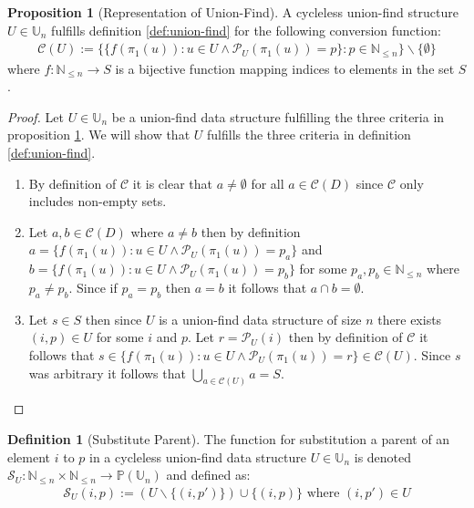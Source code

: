 \documentclass[a4paper,12pt]{article}
\theoremstyle{definition}
\newtheorem{definition}{Definition}[section]
\newtheorem{proposition}{Proposition}[section]
\begin{document}
\begin{proposition}[Representation of
    Union-Find]\label{def:representation-union-find} A cycleless union-find structure $U
    \in \mathbb{U}_n$ fulfills definition \ref{def:union-find} for the following conversion function:
    \begin{align*}
        \mathcal{C}(U) := \{\{f(\pi_1(u)) : u \in U \land \mathcal{P}_U(\pi_1(u)) = p \} : p \in \mathbb{N}_{\leq n}\} \backslash \{\emptyset\}
    \end{align*}
    where $f : \mathbb{N}_{\leq n} \to S$ is a bijective function mapping
    indices to elements in the set $S$.
\end{proposition}
\begin{proof}
    Let $U \in \mathbb{U}_n$ be a union-find data structure fulfilling the three
    criteria in proposition \ref{def:representation-union-find}. We will show
    that $U$ fulfills the three criteria in definition \ref{def:union-find}.

    \begin{enumerate}
        \item By definition of $\mathcal{C}$ it is clear that $a \neq \emptyset$
        for all $a \in \mathcal{C}(D)$ since $\mathcal{C}$ only includes
        non-empty sets.
        \item Let $a, b \in \mathcal{C}(D)$ where $a \neq b$ then by definition
        $a = \{f(\pi_1(u)) : u \in U \land \mathcal{P}_U(\pi_1(u)) = p_a \}$ and
        $b = \{f(\pi_1(u)) : u \in U \land \mathcal{P}_U(\pi_1(u)) = p_b \}$ for
        some $p_a, p_b \in \mathbb{N}_{\leq n}$ where $p_a \neq p_b$. Since if
        $p_a = p_b$ then $a = b$ it follows that $a \cap b = \emptyset$.
        \item Let $s \in S$ then since $U$ is a union-find data structure of size
        $n$ there exists $(i, p) \in U$ for some $i$ and $p$. Let $r =
        \mathcal{P}_U(i)$ then by definition of $\mathcal{C}$ it follows that $s
        \in \{f(\pi_1(u)) : u \in U \land \mathcal{P}_U(\pi_1(u)) = r \} \in
        \mathcal{C}(U)$. Since $s$ was arbitrary it follows that $\bigcup_{a \in
        \mathcal{C}(U)} a = S$.
    \end{enumerate}
\end{proof}

\begin{definition}[Substitute Parent]
    The function for substitution a parent of an element $i$ to $p$ in a
    cycleless union-find data structure $U \in \mathbb{U}_n$ is denoted
    $\mathcal{S}_U : \mathbb{N}_{\leq n} \times \mathbb{N}_{\leq n} \to
    \mathbb{P}(\mathbb{U}_n)$ and defined as:
    \begin{align*}
        \mathcal{S}_U(i, p) := (U \backslash \{(i, p')\}) \cup \{(i, p)\} \text{ where } (i, p') \in U
    \end{align*}
\end{definition}
\end{document}
